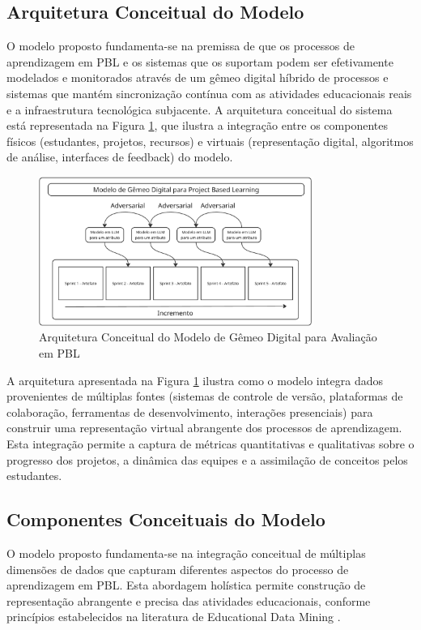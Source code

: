 \documentclass[12pt, a4paper, oneside, brazilian]{abntex2}
\begin{document}
\subsection{Arquitetura Conceitual do Modelo}

O modelo proposto fundamenta-se na premissa de que os processos de aprendizagem em PBL e os sistemas que os suportam podem ser efetivamente modelados e monitorados através de um gêmeo digital híbrido de processos e sistemas que mantém sincronização contínua com as atividades educacionais reais e a infraestrutura tecnológica subjacente. A arquitetura conceitual do sistema está representada na Figura \ref{fig:modelo_proposto}, que ilustra a integração entre os componentes físicos (estudantes, projetos, recursos) e virtuais (representação digital, algoritmos de análise, interfaces de feedback) do modelo.

\begin{figure}[htbp]
\centering
\includegraphics[width=0.8\textwidth]{assets/f1.png}
\caption{Arquitetura Conceitual do Modelo de Gêmeo Digital para Avaliação em PBL}
\label{fig:modelo_proposto}
\end{figure}

A arquitetura apresentada na Figura \ref{fig:modelo_proposto} ilustra como o modelo integra dados provenientes de múltiplas fontes (sistemas de controle de versão, plataformas de colaboração, ferramentas de desenvolvimento, interações presenciais) para construir uma representação virtual abrangente dos processos de aprendizagem. Esta integração permite a captura de métricas quantitativas e qualitativas sobre o progresso dos projetos, a dinâmica das equipes e a assimilação de conceitos pelos estudantes.

\subsection{Componentes Conceituais do Modelo}

O modelo proposto fundamenta-se na integração conceitual de múltiplas dimensões de dados que capturam diferentes aspectos do processo de aprendizagem em PBL. Esta abordagem holística permite construção de representação abrangente e precisa das atividades educacionais, conforme princípios estabelecidos na literatura de Educational Data Mining \cite{romero2010, romero2020}.
\end{document}

